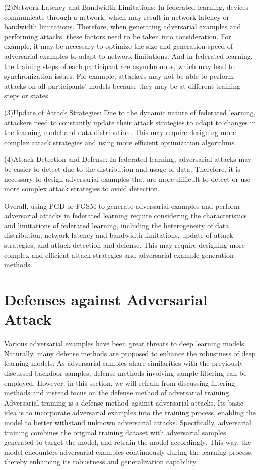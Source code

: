 (2)Network Latency and Bandwidth Limitations:
In federated learning, devices communicate through a
network, which may result in network latency or
bandwidth limitations. Therefore, when generating adversarial
examples and performing attacks, these factors need to
be taken into consideration. For example, it may be
necessary to optimize the size and generation speed of
adversarial examples to adapt to network limitations. And
in federated learning, the training steps of each participant
are asynchronous, which may lead to synchronization
issues. For example, attackers may not be able to perform
attacks on all participants' models because they may be
at different training steps or states.  

(3)Update of Attack Strategies: Due to the dynamic
nature of federated learning, attackers need to constantly
update their attack strategies to adapt to changes in the
learning model and data distribution. This may require
designing more complex attack strategies and using more
eﬀicient optimization algorithms.

(4)Attack Detection and Defense: In federated learning,
adversarial attacks may be easier to detect due to the
distribution and usage of data. Therefore, it is necessary
to design adversarial examples that are more diﬀicult to
detect or use more complex attack strategies to avoid
detection.  

Overall, using PGD or FGSM to generate adversarial
examples and perform adversarial attacks in federated
learning require considering the characteristics and limitations of federated learning, including the heterogeneity
of data distribution, network latency and bandwidth limitations,
update of attack strategies, and attack detection
and defense. This may require designing more complex
and eﬀicient attack strategies and adversarial example
generation methods.  

\section{Defenses against Adversarial Attack}  
\label{Defenses against Adversarial Attack}
Various adversarial examples have been great threats to
deep learning models. Naturally, many defense methods
are proposed to enhance the robustness of deep learning
models. As adversarial samples share similarities with the
previously discussed backdoor samples, defense methods
involving sample filtering can be employed. However, in
this section, we will refrain from discussing filtering methods and instead focus on the defense method of adversarial
training. Adversarial training is a defense method against
adversarial attacks. Its basic idea is to incorporate
adversarial examples into the training process, enabling the
model to better withstand unknown adversarial attacks.
Specifically, adversarial training combines the original
training dataset with adversarial samples generated to
target the model, and retrain the model accordingly. This
way, the model encounters adversarial examples
continuously during the learning process, thereby enhancing
its robustness and generalization capability.  

